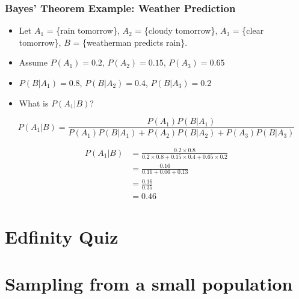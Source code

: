 \documentclass[slidestop,compress,mathserif]{beamer}
\begin{document}
\begin{frame}
\frametitle{Bayes' Theorem Example: Weather Prediction}

\begin{itemize}
	\item Let $A_1$ = \{rain tomorrow\}, $A_2$ = \{cloudy tomorrow\}, $A_3$ = \{clear tomorrow\}, $B$ = \{weatherman predicts rain\}.
	\item Assume $P(A_1) = 0.2$, $P(A_2) = 0.15$, $P(A_3) = 0.65$
	\item $P(B|A_1) = 0.8$, $P(B|A_2) = 0.4$, $P(B|A_3) = 0.2$
	\item What is $P(A_1|B)$?
\end{itemize}

\vspace{2mm}
\pause
\[
P(A_1|B) = \frac{P(A_1)P(B|A_1)}{P(A_1)P(B|A_1) + P(A_2)P(B|A_2) + P(A_3)P(B|A_3)}
\]

\begin{align*}
P(A_1|B) &= \frac{0.2 \times 0.8}{0.2 \times 0.8 + 0.15 \times 0.4 + 0.65 \times 0.2} \\
				&= \frac{0.16}{0.16 + 0.06 + 0.13} \\
				&= \frac{0.16}{0.35} \\
				&= 0.46
\end{align*}
\end{frame}


\section{Edfinity Quiz}



\section{Sampling from a small population}

\end{document}
